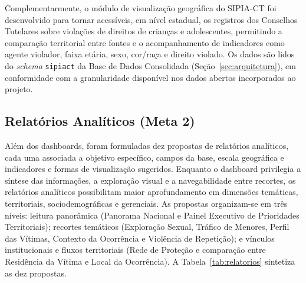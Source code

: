 \documentclass[11pt,a4paper]{article}
\begin{document}
Complementarmente, o módulo de visualização geográfica do SIPIA-CT foi desenvolvido para tornar acessíveis, em nível estadual, os registros dos Conselhos Tutelares sobre violações de direitos de crianças e adolescentes, permitindo a comparação territorial entre fontes e o acompanhamento de indicadores como agente violador, faixa etária, sexo, cor/raça e direito violado. Os dados são lidos do \emph{schema} \texttt{sipiact} da Base de Dados Consolidada (Seção~\ref{sec:arquitetura}), em conformidade com a granularidade disponível nos dados abertos incorporados ao projeto.


\subsection{Relatórios Analíticos (Meta 2)}
\label{subsec:relatorios_analiticos}

Além dos dashboards, foram formuladas dez propostas de relatórios analíticos, cada uma associada a objetivo específico, campos da base, escala geográfica e indicadores e formas de visualização sugeridos. Enquanto o dashboard privilegia a síntese das informações, a exploração visual e a navegabilidade entre recortes, os relatórios analíticos possibilitam maior aprofundamento em dimensões temáticas, territoriais, sociodemográficas e gerenciais. As propostas organizam-se em três níveis: leitura panorâmica (Panorama Nacional e Painel Executivo de Prioridades Territoriais); recortes temáticos (Exploração Sexual, Tráfico de Menores, Perfil das Vítimas, Contexto da Ocorrência e Violência de Repetição); e vínculos institucionais e fluxos territoriais (Rede de Proteção e comparação entre Residência da Vítima e Local da Ocorrência). A Tabela~\ref{tab:relatorios} sintetiza as dez propostas.
\end{document}
